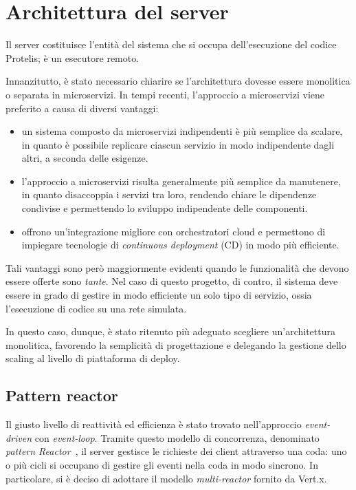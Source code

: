   \section{Architettura del server}\label{sec:arch:server}

    Il server costituisce l'entità del sistema che si occupa dell'esecuzione del codice Protelis; è un esecutore remoto.

    Innanzitutto, è stato necessario chiarire se l'architettura dovesse essere monolitica o separata in microservizi.
    In tempi recenti, l'approccio a microservizi viene preferito a causa di diversi vantaggi:

    \begin{itemize}
      \item
        un sistema composto da microservizi indipendenti è più semplice da scalare,
        in quanto è possibile replicare ciascun servizio in modo indipendente dagli altri, a seconda delle esigenze.
      \item
        l'approccio a microservizi risulta generalmente più semplice da manutenere,
        in quanto disaccoppia i servizi tra loro, rendendo chiare le dipendenze condivise e permettendo lo sviluppo indipendente delle componenti.
      \item
        offrono un'integrazione migliore con orchestratori cloud e permettono di impiegare tecnologie di \emph{continuous deployment} (CD) in modo più efficiente.
    \end{itemize}

    Tali vantaggi sono però maggiormente evidenti quando le funzionalità che devono essere offerte sono \emph{tante}.
    Nel caso di questo progetto, di contro, il sistema deve essere in grado di gestire in modo efficiente un solo tipo di servizio, ossia l'esecuzione di codice su una rete simulata.

    In questo caso, dunque, è stato ritenuto più adeguato scegliere un'architettura monolitica, favorendo la semplicità di progettazione
    e delegando la gestione dello scaling al livello di piattaforma di deploy.

    \subsection{Pattern reactor}\label{subsec:reactor}

      Il giusto livello di reattività ed efficienza è stato trovato nell'approccio \emph{event-driven} con \emph{event-loop}.
      Tramite questo modello di concorrenza, denominato \emph{pattern Reactor}~\cite{Schmidt1995ReactorAO}, il server gestisce le richieste dei client attraverso una coda:
      uno o più cicli si occupano di gestire gli eventi nella coda in modo sincrono.
      In particolare, si è deciso di adottare il modello \emph{multi-reactor} fornito da Vert.x.

